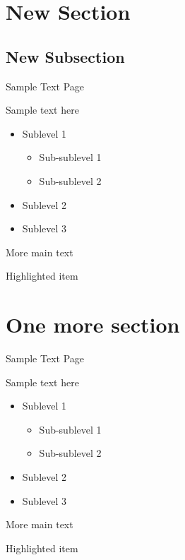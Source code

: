 \documentclass[aspectratio=169]{beamer}
\begin{document}
		\section{New Section}
		
		\subsection{New Subsection}
		
        \begin{frame}{Sample Text Page}
            \begin{vfilleditems}
                \item Sample text here
                \begin{itemize}
                    \item Sublevel 1
                    \begin{itemize}
                             	\item Sub-sublevel 1
                             	\item Sub-sublevel 2
                    \end{itemize}
                    \item Sublevel 2
                    \item Sublevel 3
                \end{itemize}
                \item More main text
                \item \alert{Highlighted item}
            \end{vfilleditems}
        \end{frame}
        
        \section{One more section}
        
        \begin{frame}{Sample Text Page}
        	\begin{vfilleditems}
        		\item Sample text here
        		\begin{itemize}
        			\item Sublevel 1
        			\begin{itemize}
        				\item Sub-sublevel 1
        				\item Sub-sublevel 2
        			\end{itemize}
        			\item Sublevel 2
        			\item Sublevel 3
        		\end{itemize}
        		\item More main text
        		\item \alert{Highlighted item}
        	\end{vfilleditems}
        \end{frame}
        
\end{document}

